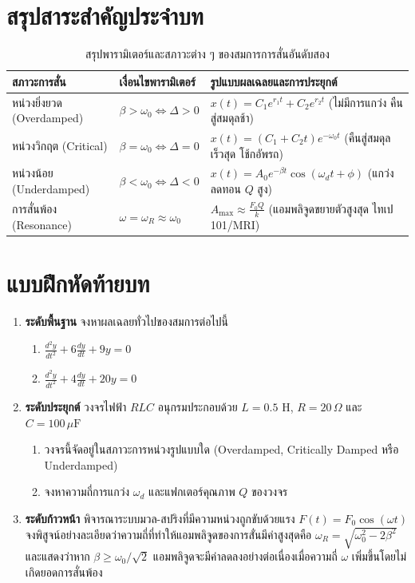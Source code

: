 \section{สรุปสาระสำคัญประจำบท}
\begin{table}[H]
\centering
\caption{สรุปพารามิเตอร์และสภาวะต่าง ๆ ของสมการการสั่นอันดับสอง}
\label{tab:ch09_summary}
\begin{tabularx}{\textwidth}{p{3.0cm}p{4.2cm}Y}
\toprule
\textbf{สภาวะการสั่น} & \textbf{เงื่อนไขพารามิเตอร์} & \textbf{รูปแบบผลเฉลยและการประยุกต์} \\
\midrule
หน่วงยิ่งยวด (Overdamped) & $\beta > \omega_0 \iff \Delta > 0$ & $x(t) = C_1 e^{r_1 t} + C_2 e^{r_2 t}$ (ไม่มีการแกว่ง คืนสู่สมดุลช้า) \\
หน่วงวิกฤต (Critical) & $\beta = \omega_0 \iff \Delta = 0$ & $x(t) = (C_1 + C_2 t)e^{-\omega_0 t}$ (คืนสู่สมดุลเร็วสุด โช้กอัพรถ) \\
หน่วงน้อย (Underdamped) & $\beta < \omega_0 \iff \Delta < 0$ & $x(t) = A_0 e^{-\beta t}\cos(\omega_d t + \phi)$ (แกว่งลดทอน $Q$ สูง) \\
การสั่นพ้อง (Resonance) & $\omega = \omega_R \approx \omega_0$ & $A_{\text{max}} \approx \frac{F_0 Q}{k}$ (แอมพลิจูดขยายตัวสูงสุด ไทเป 101/MRI) \\
\bottomrule
\end{tabularx}
\end{table}

\section{แบบฝึกหัดท้ายบท}
\begin{enumerate}
    \item \textbf{ระดับพื้นฐาน} จงหาผลเฉลยทั่วไปของสมการต่อไปนี้
    \begin{enumerate}
        \item $\frac{d^2y}{dt^2} + 6\frac{dy}{dt} + 9y = 0$
        \item $\frac{d^2y}{dt^2} + 4\frac{dy}{dt} + 20y = 0$
    \end{enumerate}

    \item \textbf{ระดับประยุกต์} วงจรไฟฟ้า $RLC$ อนุกรมประกอบด้วย $L = 0.5\text{ H}$, $R = 20\,\Omega$ และ $C = 100\,\mu\text{F}$
    \begin{enumerate}
        \item วงจรนี้จัดอยู่ในสภาวะการหน่วงรูปแบบใด (Overdamped, Critically Damped หรือ Underdamped)
        \item จงหาความถี่การแกว่ง $\omega_d$ และแฟกเตอร์คุณภาพ $Q$ ของวงจร
    \end{enumerate}

    \item \textbf{ระดับก้าวหน้า} พิจารณาระบบมวล-สปริงที่มีความหน่วงถูกขับด้วยแรง $F(t) = F_0 \cos(\omega t)$ จงพิสูจน์อย่างละเอียดว่าความถี่ที่ทำให้แอมพลิจูดของการสั่นมีค่าสูงสุดคือ $\omega_R = \sqrt{\omega_0^2 - 2\beta^2}$ และแสดงว่าหาก $\beta \ge \omega_0/\sqrt{2}$ แอมพลิจูดจะมีค่าลดลงอย่างต่อเนื่องเมื่อความถี่ $\omega$ เพิ่มขึ้นโดยไม่เกิดยอดการสั่นพ้อง
\end{enumerate}
